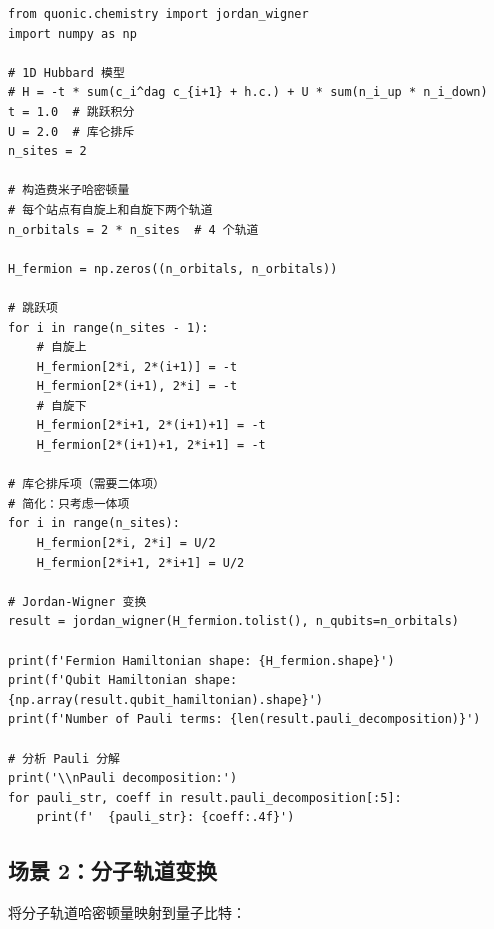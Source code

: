 \documentclass[12pt,a4paper]{article}
\begin{document}
\begin{verbatim}
from quonic.chemistry import jordan_wigner
import numpy as np

# 1D Hubbard 模型
# H = -t * sum(c_i^dag c_{i+1} + h.c.) + U * sum(n_i_up * n_i_down)
t = 1.0  # 跳跃积分
U = 2.0  # 库仑排斥
n_sites = 2

# 构造费米子哈密顿量
# 每个站点有自旋上和自旋下两个轨道
n_orbitals = 2 * n_sites  # 4 个轨道

H_fermion = np.zeros((n_orbitals, n_orbitals))

# 跳跃项
for i in range(n_sites - 1):
    # 自旋上
    H_fermion[2*i, 2*(i+1)] = -t
    H_fermion[2*(i+1), 2*i] = -t
    # 自旋下
    H_fermion[2*i+1, 2*(i+1)+1] = -t
    H_fermion[2*(i+1)+1, 2*i+1] = -t

# 库仑排斥项（需要二体项）
# 简化：只考虑一体项
for i in range(n_sites):
    H_fermion[2*i, 2*i] = U/2
    H_fermion[2*i+1, 2*i+1] = U/2

# Jordan-Wigner 变换
result = jordan_wigner(H_fermion.tolist(), n_qubits=n_orbitals)

print(f'Fermion Hamiltonian shape: {H_fermion.shape}')
print(f'Qubit Hamiltonian shape: {np.array(result.qubit_hamiltonian).shape}')
print(f'Number of Pauli terms: {len(result.pauli_decomposition)}')

# 分析 Pauli 分解
print('\\nPauli decomposition:')
for pauli_str, coeff in result.pauli_decomposition[:5]:
    print(f'  {pauli_str}: {coeff:.4f}')
\end{verbatim}

\subsection{场景 2：分子轨道变换}

将分子轨道哈密顿量映射到量子比特：
\end{document}
